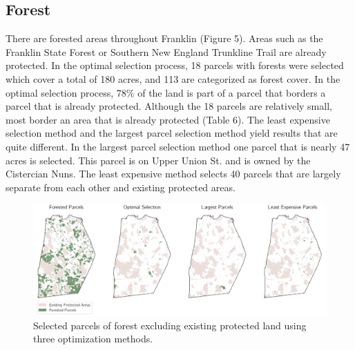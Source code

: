 \documentclass[12pt, stu, floatsintext,table]{apa7}
\begin{document}
\subsection{Forest}
 There are forested areas throughout Franklin (Figure 5). Areas such as the Franklin State Forest or Southern New England Trunkline Trail are already protected. In the optimal selection process, 18 parcels with forests were selected which cover a total of 180 acres, and 113 are categorized as forest cover. In the optimal selection process, 78\% of the land is part of a parcel that borders a parcel that is already protected. Although the 18 parcels are relatively small, most border an area that is already protected (Table 6). The least expensive selection method and the largest parcel selection method yield results that are quite different. In the largest parcel selection method one parcel that is nearly 47 acres is selected. This parcel is on Upper Union St. and is owned by the Cistercian Nuns. The least expensive method selects 40 parcels that are largely separate from each other and existing protected areas. 
\begin{figure}[hbtp]
    \centering
    \includegraphics[width = \textwidth]{figures/n_61forest.png}
    \caption{Selected parcels of forest excluding existing protected land using three optimization methods. }
\end{figure}
\end{document}
